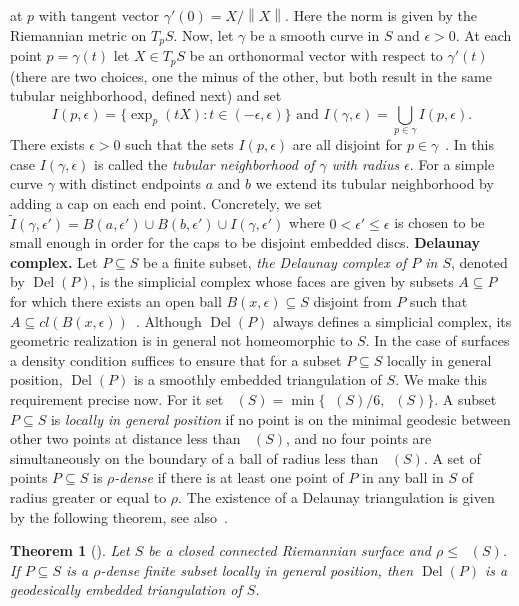 \documentclass[11pt]{article}
\newtheorem{theorem}{Theorem}
\numberwithin{claimcounter}{theorem}
\theoremstyle{remark}
\theoremstyle{definition}
\numberwithin{theorem}{section}
\newcommand{\norm}[1]{\left\|#1\right\|} %
\DeclareMathOperator{\rinj}{r_{inj}}
\DeclareMathOperator{\rscv}{r_{scv}}
\DeclareMathOperator{\rdel}{r_{Del}}
\DeclareMathOperator{\Del}{Del}
\begin{document}
at $p$ with tangent vector $\gamma'(0)=X/\norm{X}$. Here the norm is given by the Riemannian metric on $T_pS$.
Now, let $\gamma$ be a smooth curve in $S$ and $\epsilon>0$.
At each point $p=\gamma(t)$ let $X\in T_pS$ be an orthonormal vector with respect to $\gamma'(t)$ (there are two choices, one the minus of the other, but both result in the same tubular  neighborhood, defined next) and set
$$I(p,\epsilon) = \{ \exp_p(tX) \colon t\in (-\epsilon,\epsilon)\} \text{ and } I(\gamma,\epsilon) = \bigcup_{p\in \gamma} I(p,\epsilon).$$
There exists $\epsilon>0$ such that the sets $I(p,\epsilon)$ are all disjoint for $p\in \gamma$~\cite[Proposition 7.26]{oneill83-tubular}.
In this case $I(\gamma,\epsilon)$ is called the \emph{tubular neighborhood of $\gamma$ with radius $\epsilon$}.
For a simple curve $\gamma$ with distinct endpoints $a$ and $b$ we extend its tubular neighborhood by adding a cap on
each end point. Concretely, we set $\tilde{I}(\gamma,\epsilon') = B(a,\epsilon')\cup B(b,\epsilon')\cup I(\gamma, \epsilon')$
where $0<\epsilon'\leq \epsilon$ is chosen to be small enough in order for the caps to be disjoint embedded discs.
%
\vspace{3mm}
\noindent
{\bf Delaunay complex.} Let $P\subseteq S$ be a finite subset,
\emph{the Delaunay complex of $P$ in $S$}, denoted by $\Del(P)$,
is the simplicial complex whose faces are given by subsets $A \subseteq P$
for which there exists an open ball $B(x,\epsilon)\subseteq S$ disjoint from $P$
such that $A \subseteq cl (B(x,\epsilon))$~\cite{delaunay34-sphere}.
Although $\Del(P)$ always defines a simplicial complex, its geometric realization is in general not homeomorphic to $S$.
In the case of surfaces a density condition suffices to ensure that for a subset $P\subseteq S$ locally in general position, $\Del(P)$ is a smoothly embedded triangulation of $S$. 
We make this requirement precise now. For it set $\rdel(S) = \min\{\rinj(S)/6, \rscv(S)\}$.
A subset $P\subseteq S$ is \emph{locally in general position} if no point is on the minimal geodesic between other two points at distance less than $\rdel(S)$, and no four points are simultaneously on the boundary of a ball of radius less than $\rdel(S)$.
A set of points $P\subseteq S$ is \emph{$\rho$-dense} if there is at least one point of $P$
in any ball in $S$ of radius greater or equal to $\rho$.
The existence of a Delaunay triangulation is given by the following theorem,
see also~\cite[Theorem 2]{dyer08-surface}.
%
\begin{theorem}[\cite{leibon99-delaunay}]
  \label{t:deltriang}
  Let $S$ be a closed connected Riemannian surface and $\rho \leq \rdel(S)$.
  If $P\subseteq S$ is a $\rho$-dense finite subset locally in general position,
  then $\Del(P)$ is a geodesically embedded triangulation of $S$. 
\end{theorem}
\end{document}
